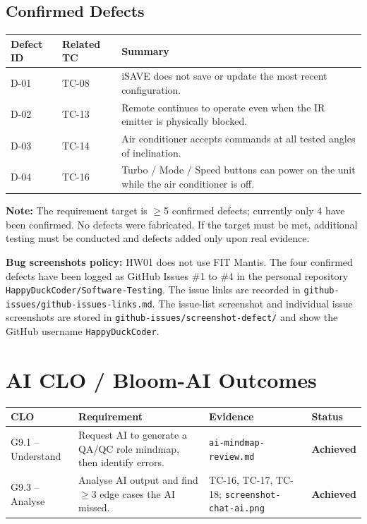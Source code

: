 \documentclass[12pt, a4paper]{article}
\newcommand{\achieved}{\textcolor{passgreen}{\textbf{Achieved}}}
\begin{document}
\subsection{Confirmed Defects}

\begin{table}[h!]
\centering
\begin{tabularx}{\textwidth}{C{1.8cm} C{2cm} X}
\toprule
\textbf{Defect ID} & \textbf{Related TC} & \textbf{Summary} \\
\midrule
D-01 & TC-08 & iSAVE does not save or update the most recent configuration. \\
D-02 & TC-13 & Remote continues to operate even when the IR emitter is physically blocked. \\
D-03 & TC-14 & Air conditioner accepts commands at all tested angles of inclination. \\
D-04 & TC-16 & Turbo / Mode / Speed buttons can power on the unit while the air conditioner is off. \\
\bottomrule
\end{tabularx}
\end{table}

\textbf{Note:} The requirement target is $\geq$5 confirmed defects; currently only 4 have been confirmed. No defects were fabricated. If the target must be met, additional testing must be conducted and defects added only upon real evidence.

\textbf{Bug screenshots policy:} HW01 does not use FIT Mantis. The four confirmed defects have been logged as GitHub Issues \#1 to \#4 in the personal repository \texttt{HappyDuckCoder/Software-Testing}. The issue links are recorded in \texttt{github-issues/github-issues-links.md}. The issue-list screenshot and individual issue screenshots are stored in \texttt{github-issues/screenshot-defect/} and show the GitHub username \texttt{HappyDuckCoder}.

\section{AI CLO / Bloom-AI Outcomes}

\begin{table}[h!]
\centering
\begin{tabularx}{\textwidth}{L{3.5cm} X L{5cm} C{2cm}}
\toprule
\textbf{CLO} & \textbf{Requirement} & \textbf{Evidence} & \textbf{Status} \\
\midrule
G9.1 -- Understand & Request AI to generate a QA/QC role mindmap, then identify errors. & \texttt{ai-mindmap-review.md} & \achieved \\
G9.3 -- Analyse & Analyse AI output and find $\geq$3 edge cases the AI missed. & TC-16, TC-17, TC-18; \texttt{screenshot-chat-ai.png} & \achieved \\
\bottomrule
\end{tabularx}
\end{table}
\end{document}
